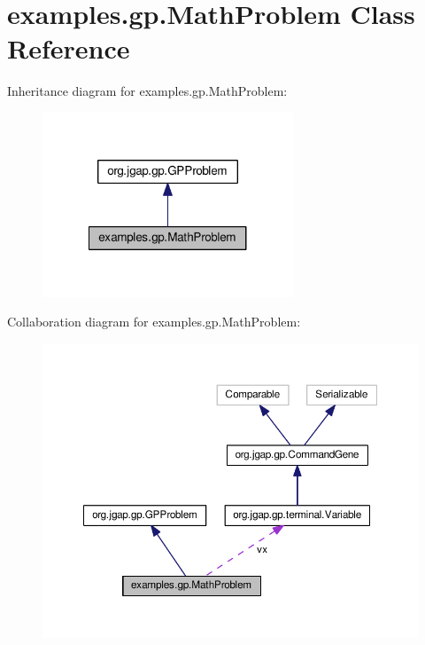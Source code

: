 \hypertarget{classexamples_1_1gp_1_1_math_problem}{\section{examples.\-gp.\-Math\-Problem Class Reference}
\label{classexamples_1_1gp_1_1_math_problem}
}


Inheritance diagram for examples.\-gp.\-Math\-Problem\-:
\nopagebreak
\begin{figure}[H]
\begin{center}
\leavevmode
\includegraphics[width=212pt]{classexamples_1_1gp_1_1_math_problem__inherit__graph}
\end{center}
\end{figure}


Collaboration diagram for examples.\-gp.\-Math\-Problem\-:
\nopagebreak
\begin{figure}[H]
\begin{center}
\leavevmode
\includegraphics[width=350pt]{classexamples_1_1gp_1_1_math_problem__coll__graph}
\end{center}
\end{figure}
